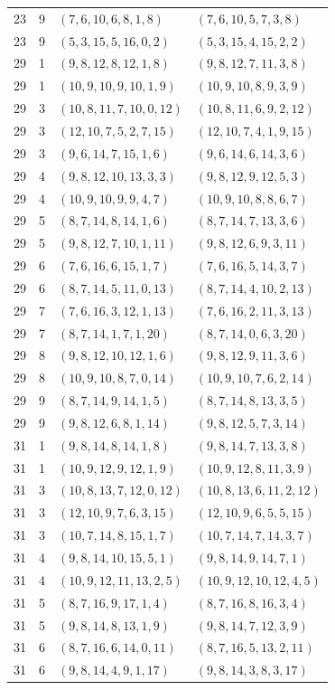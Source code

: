 \documentclass[11pt,a4paper]{article}
\theoremstyle{definition}
\numberwithin{equation}{section}
\begin{document}
\begin{longtable}{rrll}
23&9&$(7,6,10,6,8,1,8)$&$(7,6,10,5,7,3,8)$\\
23&9&$(5,3,15,5,16,0,2)$&$(5,3,15,4,15,2,2)$\\
29&1&$(9,8,12,8,12,1,8)$&$(9,8,12,7,11,3,8)$\\
29&1&$(10,9,10,9,10,1,9)$&$(10,9,10,8,9,3,9)$\\
29&3&$(10,8,11,7,10,0,12)$&$(10,8,11,6,9,2,12)$\\
29&3&$(12,10,7,5,2,7,15)$&$(12,10,7,4,1,9,15)$\\
29&3&$(9,6,14,7,15,1,6)$&$(9,6,14,6,14,3,6)$\\
29&4&$(9,8,12,10,13,3,3)$&$(9,8,12,9,12,5,3)$\\
29&4&$(10,9,10,9,9,4,7)$&$(10,9,10,8,8,6,7)$\\
29&5&$(8,7,14,8,14,1,6)$&$(8,7,14,7,13,3,6)$\\
29&5&$(9,8,12,7,10,1,11)$&$(9,8,12,6,9,3,11)$\\
29&6&$(7,6,16,6,15,1,7)$&$(7,6,16,5,14,3,7)$\\
29&6&$(8,7,14,5,11,0,13)$&$(8,7,14,4,10,2,13)$\\
29&7&$(7,6,16,3,12,1,13)$&$(7,6,16,2,11,3,13)$\\
29&7&$(8,7,14,1,7,1,20)$&$(8,7,14,0,6,3,20)$\\
29&8&$(9,8,12,10,12,1,6)$&$(9,8,12,9,11,3,6)$\\
29&8&$(10,9,10,8,7,0,14)$&$(10,9,10,7,6,2,14)$\\
29&9&$(8,7,14,9,14,1,5)$&$(8,7,14,8,13,3,5)$\\
29&9&$(9,8,12,6,8,1,14)$&$(9,8,12,5,7,3,14)$\\
31&1&$(9,8,14,8,14,1,8)$&$(9,8,14,7,13,3,8)$\\
31&1&$(10,9,12,9,12,1,9)$&$(10,9,12,8,11,3,9)$\\
31&3&$(10,8,13,7,12,0,12)$&$(10,8,13,6,11,2,12)$\\
31&3&$(12,10,9,7,6,3,15)$&$(12,10,9,6,5,5,15)$\\
31&3&$(10,7,14,8,15,1,7)$&$(10,7,14,7,14,3,7)$\\
31&4&$(9,8,14,10,15,5,1)$&$(9,8,14,9,14,7,1)$\\
31&4&$(10,9,12,11,13,2,5)$&$(10,9,12,10,12,4,5)$\\
31&5&$(8,7,16,9,17,1,4)$&$(8,7,16,8,16,3,4)$\\
31&5&$(9,8,14,8,13,1,9)$&$(9,8,14,7,12,3,9)$\\
31&6&$(8,7,16,6,14,0,11)$&$(8,7,16,5,13,2,11)$\\
31&6&$(9,8,14,4,9,1,17)$&$(9,8,14,3,8,3,17)$\\

\end{longtable}
\end{document}

